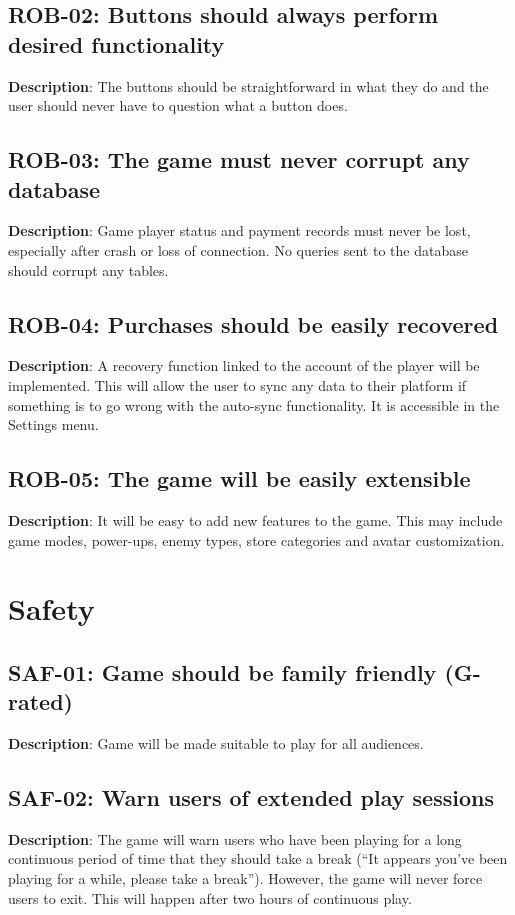 \subsection{ROB-02: Buttons should always perform desired functionality}
\textbf{Description}: The buttons should be straightforward in what they do
and the user should never have to question what a button does.

\subsection{ROB-03: The game must never corrupt any database}
\textbf{Description}: Game player status and payment records must never be
lost, especially after crash or loss of connection. No queries sent
to the database should corrupt any tables.

\subsection{ROB-04: Purchases should be easily recovered}
\textbf{Description}: A recovery function linked to the account of the player
will be implemented. This will allow the user to sync any data to
their platform if something is to go wrong with the auto-sync functionality.
It is accessible in the Settings menu.

\subsection{ROB-05: The game will be easily extensible}
\textbf{Description}: It will be easy to add new features to the game. This
may include game modes, power-ups, enemy types, store categories and
avatar customization.

\section{Safety}

\subsection{SAF-01: Game should be family friendly (G-rated)}
\textbf{Description}: Game will be made suitable to play for all audiences.

\subsection{SAF-02: Warn users of extended play sessions}
\textbf{Description}: The game will warn users who have been playing for a
long continuous period of time that they should take a break (\textquotedblleft{}It
appears you\textquoteright{}ve been playing for a while, please take
a break\textquotedblright{}). However, the game will never force users
to exit. This will happen after two hours of continuous play.

